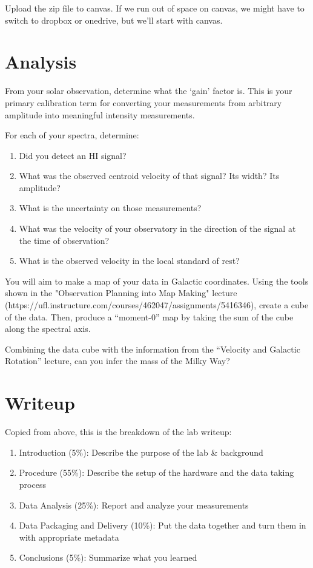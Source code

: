 \documentclass[11pt]{article}
\begin{document}
Upload the zip file to canvas.  If we run out of space on canvas, we might have
to switch to dropbox or onedrive, but we'll start with canvas.


\section{Analysis}

From your solar observation, determine what the `gain' factor is.  This is your primary
calibration term for converting your measurements from arbitrary amplitude into meaningful
intensity measurements.

For each of your spectra, determine:
\begin{enumerate}
    \item Did you detect an HI signal?
    \item What was the observed centroid velocity of that signal?  Its width?  Its amplitude?
    \item What is the uncertainty on those measurements?
    \item What was the velocity of your observatory in the direction of the signal
        at the time of observation?
    \item What is the observed velocity in the local standard of rest?
\end{enumerate}

You will aim to make a map of your data in Galactic coordinates.
Using the tools shown in the "Observation Planning into Map Making" lecture
(https://ufl.instructure.com/courses/462047/assignments/5416346),
create a cube of the data.
Then, produce a ``moment-0'' map by taking the sum of the cube along the spectral
axis.

Combining the data cube with the information from the ``Velocity and Galactic
Rotation'' lecture, can you infer the mass of the Milky Way?


\section{Writeup}

Copied from above, this is the breakdown of the lab writeup:
\begin{enumerate}
    \item Introduction (5\%): Describe the purpose of the lab \& background
    \item Procedure (55\%): Describe the setup of the hardware and the data taking process
    \item Data Analysis (25\%):  Report and analyze your measurements
    \item Data Packaging and Delivery (10\%): Put the data together and turn them in with appropriate metadata
    \item Conclusions (5\%): Summarize what you learned
\end{enumerate}
\end{document}
